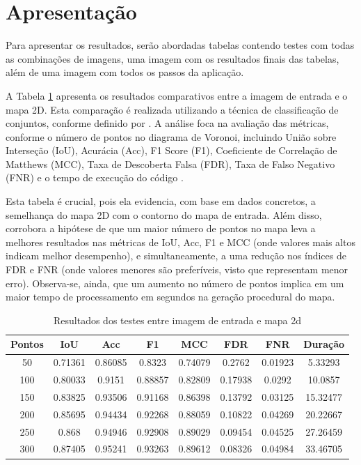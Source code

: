 \section{Apresentação}

Para apresentar os resultados, serão abordadas tabelas contendo testes com todas as combinações de imagens, uma imagem com os resultados finais das tabelas, além de uma imagem com todos os passos da aplicação.

A Tabela \ref{tab:final_input_output_2d} apresenta os resultados comparativos entre a imagem de entrada e o mapa 2D. Esta comparação é realizada utilizando a técnica de classificação de conjuntos, conforme definido por \cite{kirillov2019panoptic}. A análise foca na avaliação das métricas, conforme o número de pontos no diagrama de Voronoi, incluindo União sobre Interseção (IoU), Acurácia (Acc), F1 Score (F1), Coeficiente de Correlação de Matthews (MCC), Taxa de Descoberta Falsa (FDR), Taxa de Falso Negativo (FNR) e o tempo de execução do código \cite{Chicco2020, confusion_matrix_calculator, iou_metric_link}.

Esta tabela é crucial, pois ela evidencia, com base em dados concretos, a semelhança do mapa 2D com o contorno do mapa de entrada. Além disso, corrobora a hipótese de que um maior número de pontos no mapa leva a melhores resultados nas métricas de IoU, Acc, F1 e MCC (onde valores mais altos indicam melhor desempenho), e simultaneamente, a uma redução nos índices de FDR e FNR (onde valores menores são preferíveis, visto que representam menor erro). Observa-se, ainda, que um aumento no número de pontos implica em um maior tempo de processamento em segundos na geração procedural do mapa.

\begin{table}[h]
	\centering
	\caption{Resultados dos testes entre imagem de entrada e mapa 2d}
	\label{tab:final_input_output_2d}
	\begin{tabular}{|c|c|c|c|c|c|c|c|}
		\hline
						Pontos & IoU & Acc & F1 & MCC & FDR & FNR & Duração \\
		\hline
		50 & 0.71361 & 0.86085 & 0.8323 & 0.74079 & 0.2762 & 0.01923 & 5.33293\\
100 & 0.80033 & 0.9151 & 0.88857 & 0.82809 & 0.17938 & 0.0292 & 10.0857\\
150 & 0.83825 & 0.93506 & 0.91168 & 0.86398 & 0.13792 & 0.03125 & 15.32477\\
200 & 0.85695 & 0.94434 & 0.92268 & 0.88059 & 0.10822 & 0.04269 & 20.22667\\
250 & 0.868 & 0.94946 & 0.92908 & 0.89029 & 0.09454 & 0.04525 & 27.26459\\
300 & 0.87405 & 0.95241 & 0.93263 & 0.89612 & 0.08326 & 0.04984 & 33.46705\\
		\hline
	\end{tabular}
\end{table}


